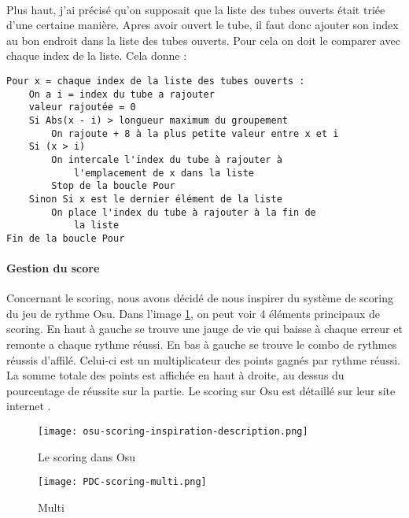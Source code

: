 \paragraph{}Plus haut, j'ai précisé qu'on supposait que la liste des tubes ouverts était triée d'une certaine manière. Apres avoir ouvert le tube, il faut donc ajouter son index au
bon endroit dans la liste des tubes ouverts. Pour cela on doit le comparer avec chaque index de la liste. Cela donne :
\begin{verbatim}
Pour x = chaque index de la liste des tubes ouverts :
    On a i = index du tube a rajouter
    valeur rajoutée = 0
    Si Abs(x - i) > longueur maximum du groupement
        On rajoute + 8 à la plus petite valeur entre x et i
    Si (x > i)
        On intercale l'index du tube à rajouter à
            l'emplacement de x dans la liste
        Stop de la boucle Pour
    Sinon Si x est le dernier élément de la liste
        On place l'index du tube à rajouter à la fin de
            la liste
Fin de la boucle Pour
\end{verbatim}

\newpage
\paragraph{Gestion du score} Concernant le scoring, nous avons décidé de nous inspirer du système de scoring du jeu de rythme Osu. Dans l'image \ref{ScoringInspiration}, on peut voir 4
éléments principaux de scoring. En haut à gauche se trouve une jauge de vie qui baisse à chaque erreur et remonte a chaque rythme réussi. En bas à gauche se trouve le combo de rythmes
réussis d'affilé. Celui-ci est un multiplicateur des points gagnés par rythme réussi. La somme totale des points est affichée en haut à droite, au dessus du pourcentage de réussite sur
la partie. Le scoring sur Osu est détaillé sur leur site internet \cite{OSU}.\\

\begin{figure}[H]
    \begin{center}
    \texttt{[image: osu-scoring-inspiration-description.png]}
    \end{center}
    \caption{Le scoring dans Osu}
\label{ScoringInspiration}
\end{figure}

\begin{wrapfigure}[8]{l}{3cm}
    \vspace{-10pt}
    \texttt{[image: PDC-scoring-multi.png]}
    \captionsetup{labelformat=simpleNumber}
    \caption{Multi}
\end{wrapfigure}

